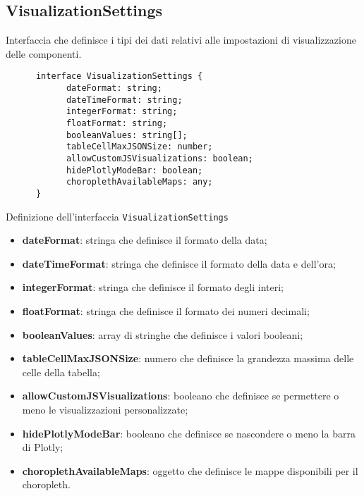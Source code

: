 \subsection{VisualizationSettings}
Interfaccia che definisce i tipi dei dati relativi alle impostazioni di visualizzazione delle componenti.
\begin{listing}[H]
      \begin{verbatim}
      interface VisualizationSettings {
            dateFormat: string;
            dateTimeFormat: string;
            integerFormat: string;
            floatFormat: string;
            booleanValues: string[];
            tableCellMaxJSONSize: number;
            allowCustomJSVisualizations: boolean;
            hidePlotlyModeBar: boolean;
            choroplethAvailableMaps: any;
      }
      \end{verbatim}
      \caption{Definizione dell'interfaccia \texttt{VisualizationSettings}}
      \label{listing:visualizationSettings}
\end{listing}
\begin{itemize}
      \item \textbf{dateFormat}: stringa che definisce il formato della data;
      \item \textbf{dateTimeFormat}: stringa che definisce il formato della data e dell'ora;
      \item \textbf{integerFormat}: stringa che definisce il formato degli interi;
      \item \textbf{floatFormat}: stringa che definisce il formato dei numeri decimali;
      \item \textbf{booleanValues}: array di stringhe che definisce i valori booleani;
      \item \textbf{tableCellMaxJSONSize}: numero che definisce la grandezza massima delle celle della tabella;
      \item \textbf{allowCustomJSVisualizations}: booleano che definisce se permettere o meno le visualizzazioni personalizzate;
      \item \textbf{hidePlotlyModeBar}: booleano che definisce se nascondere o meno la barra di Plotly;
      \item \textbf{choroplethAvailableMaps}: oggetto che definisce le mappe disponibili per il choropleth.
\end{itemize}

